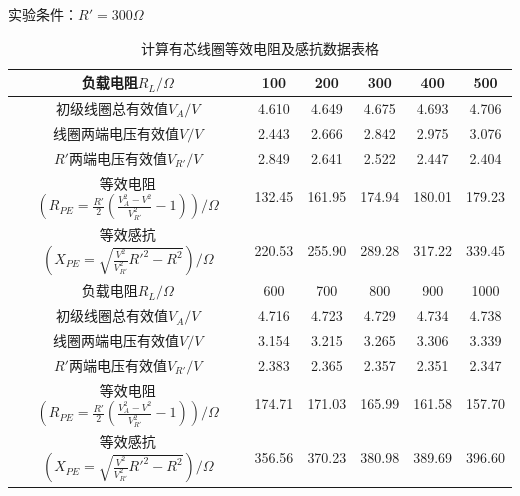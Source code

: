 \documentclass[UTF8]{ctexart}
\begin{document}
        实验条件：$R'=300\Omega$
    \vspace{-1em}
\begin{table}[H]\begin{center}
        \caption{计算有芯线圈等效电阻及感抗数据表格}
        \begin{tabular}{|c|c|c|c|c|c|}
            \hline
        \hline
        负载电阻$R_L/\Omega$&100&200&300&400&500\\
        \hline
        初级线圈总有效值$V_A/V$&4.610&4.649&4.675&4.693&4.706\\
        \hline
        线圈两端电压有效值$V/V$&2.443&2.666&2.842&2.975&3.076\\
        \hline
        $R'$两端电压有效值$V_{R'}/V$&2.849&2.641&2.522&2.447&2.404\\
        
        \hline
        等效电阻$(R_{PE}=\frac{R'}{2}(\frac{V_A^2-V^2}{V_{R'}^2}-1))/\Omega$&132.45&161.95&174.94&180.01&179.23\\
        \hline
        等效感抗$(X_{PE}=\sqrt{\frac{V^2}{V_{R'}^2}R'^2-R^2})/\Omega$&220.53&255.90&289.28&317.22&339.45\\
        \hline
        \hline

        负载电阻$R_L/\Omega$&600&700&800&900&1000\\
        \hline
        初级线圈总有效值$V_A/V$&4.716&4.723&4.729&4.734&4.738\\
        \hline
        线圈两端电压有效值$V/V$&3.154&3.215&3.265&3.306&3.339\\
        \hline
        $R'$两端电压有效值$V_{R'}/V$&2.383&2.365&2.357&2.351&2.347\\
        \hline
        等效电阻$(R_{PE}=\frac{R'}{2}(\frac{V_A^2-V^2}{V_{R'}^2}-1))/\Omega$&174.71&171.03&165.99&161.58&157.70\\
        \hline
        等效感抗$(X_{PE}=\sqrt{\frac{V^2}{V_{R'}^2}R'^2-R^2})/\Omega$&356.56&370.23&380.98&389.69&396.60\\
        \hline
        \end{tabular}
    \end{center}\end{table}
\end{document}
